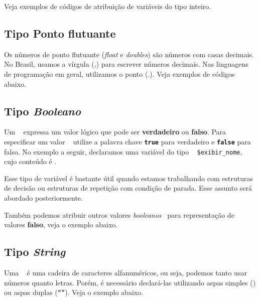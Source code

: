 Veja exemplos de códigos de atribuição de variáveis do tipo inteiro.



\subsection{Tipo Ponto flutuante}
\label{tipo-ponto-flutuante}
Os números de ponto flutuante (\textit{float} e \textit{doubles}) são números com
casas decimais. No Brasil, usamos a vírgula (,) para escrever números decimais.
Nas linguagens de programação em geral, utilizamos o ponto (.). Veja exemplos de códigos
abaixo.



\subsection{Tipo \textit{Booleano}}
\label{tipo-booleano}

Um \booleano~ expressa um valor lógico que pode ser \textbf{verdadeiro} ou 
\textbf{falso}. Para especificar um valor \booleano~ utilize a palavra chave
\texttt{\textbf{true}} para verdadeiro e \texttt{\textbf{false}} para falso. No exemplo 
a seguir, declaramos uma variável do tipo \booleano~ \texttt{\$exibir\_nome}, cujo conteúdo
é \textbf{\true}.

Esse tipo de variável é bastante útil quando estamos trabalhando com estruturas de decisão
ou estruturas de repetição com condição de parada. Esse assunto será abordado posteriormente.



Também podemos atribuir outros valores \textit{booleanos}~ para representação de valores 
\textbf{falso}, veja o exemplo abaixo.



\subsection{Tipo \textit{String}}
\label{tipo-string}

Uma \tipostring~ é uma cadeira de caracteres alfanuméricos, ou seja, podemos tanto usar números
quanto letras. Porém, é necessário declará-las utilizando aspas simples 
(\texttt{\textquotesingle \textquotesingle}) ou aspas duplas (\texttt{``''}). Veja o exemplo abaixo.

